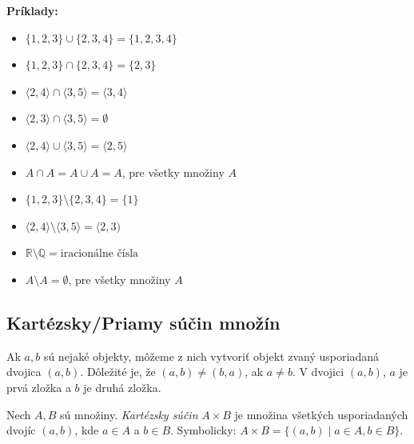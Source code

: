 \noindent\textbf{Príklady:}
\begin{itemize}
    \item $\{1,2,3\} \cup \{2,3,4\} = \{1,2,3,4\}$
    \item $\{1,2,3\} \cap \{2,3,4\} = \{2,3\}$
    \item $\langle 2,4 \rangle \cap \langle 3,5 \rangle = \langle 3,4 \rangle$
    \item $\langle 2,3 \rangle \cap \langle 3,5 \rangle = \emptyset$
    \item $\langle 2,4 \rangle \cup \langle 3,5 \rangle = \langle 2,5 \rangle$
    \item $A \cap A = A \cup A = A$, pre všetky množiny $A$
    \item $\{1,2,3\} \setminus \{2,3,4\} = \{1\}$
    \item $\langle 2,4 \rangle \setminus \langle 3,5 \rangle = \langle 2,3)$
    \item $\mathbb{R} \setminus \mathbb{Q} = \text{iracionálne čísla}$
    \item $A \setminus A = \emptyset$, pre všetky množiny $A$
\end{itemize}

\subsection{Kartézsky/Priamy súčin množín}
Ak $a, b$ sú nejaké objekty, môžeme z nich vytvoriť objekt zvaný usporiadaná dvojica $(a, b)$. Dôležité je, že $(a,b) \neq (b,a)$, ak $a \neq b$.
V dvojici $(a,b)$, $a$ je prvá zložka a $b$ je druhá zložka.

\begin{definition}
Nech $A, B$ sú množiny.
\emph{Kartézsky súčin} $A \times B$ je množina všetkých usporiadaných dvojíc $(a, b)$, kde $a \in A$ a $b \in B$.
Symbolicky: $A \times B = \{(a,b) \mid a \in A, b \in B\}$.
\end{definition}

